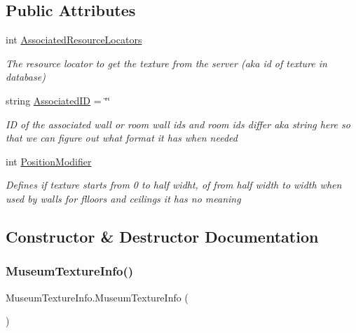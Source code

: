 \subsection*{Public Attributes}
\begin{DoxyCompactItemize}
\item 
int \mbox{\hyperlink{class_museum_texture_info_a5b0c9f041422a931cab7b3de689fe44e}{Associated\+Resource\+Locators}}
\begin{DoxyCompactList}\small\item\em The resource locator to get the texture from the server (aka id of texture in database) \end{DoxyCompactList}\item 
string \mbox{\hyperlink{class_museum_texture_info_a31425831c498a46842b2cce06e629183}{Associated\+ID}} = \char`\"{}\char`\"{}
\begin{DoxyCompactList}\small\item\em ID of the associated wall or room wall ids and room ids differ aka string here so that we can figure out what format it has when needed \end{DoxyCompactList}\item 
int \mbox{\hyperlink{class_museum_texture_info_aaa15a48a616e6212ead2dd506f452974}{Position\+Modifier}}
\begin{DoxyCompactList}\small\item\em Defines if texture starts from 0 to half widht, of from half width to width when used by walls for flloors and ceilings it has no meaning \end{DoxyCompactList}\end{DoxyCompactItemize}


\subsection{Constructor \& Destructor Documentation}
\mbox{\label{class_museum_texture_info_a930fdf9cdf96752c649660bed901178f}} 
\subsubsection{\texorpdfstring{Museum\+Texture\+Info()}{MuseumTextureInfo()}}
{\footnotesize\ttfamily Museum\+Texture\+Info.\+Museum\+Texture\+Info (\begin{DoxyParamCaption}{ }\end{DoxyParamCaption})}



